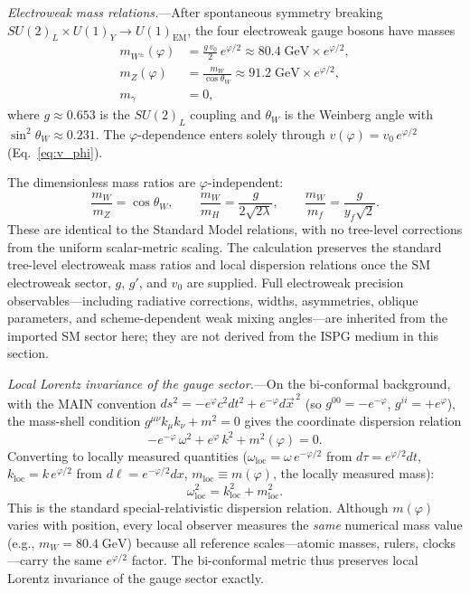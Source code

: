 \documentclass[aps,prd,onecolumn,superscriptaddress,nofootinbib,showpacs,12pt,notitlepage]{revtex4-2}
\begin{document}
\textit{Electroweak mass relations.}---After spontaneous
symmetry breaking
$SU(2)_L \times U(1)_Y \to U(1)_{\mathrm{EM}}$, the
four electroweak gauge bosons have masses
\begin{align}
  \label{eq:mW}
  m_{W^{\pm}}(\varphi)
    &= \frac{g\,v_0}{2}\,e^{\varphi/2}
    \approx 80.4\;\mathrm{GeV}\times e^{\varphi/2},\\[4pt]
  \label{eq:mZ}
  m_Z(\varphi)
    &= \frac{m_W}{\cos\theta_W}
    \approx 91.2\;\mathrm{GeV}\times e^{\varphi/2},\\[4pt]
  \label{eq:mgamma}
  m_\gamma &= 0,
\end{align}
where $g \approx 0.653$ is the $SU(2)_L$ coupling and
$\theta_W$ is the Weinberg angle with
$\sin^2\theta_W \approx 0.231$.  The $\varphi$-dependence
enters solely through $v(\varphi) = v_0\,e^{\varphi/2}$
(Eq.~\ref{eq:v_phi}).

The dimensionless mass ratios are $\varphi$-independent:
\begin{equation}\label{eq:gauge_ratios}
  \frac{m_W}{m_Z} = \cos\theta_W,\qquad
  \frac{m_W}{m_H} = \frac{g}{2\sqrt{2\lambda}},\qquad
  \frac{m_W}{m_f} = \frac{g}{y_f\sqrt{2}}.
\end{equation}
These are identical to the Standard Model relations, with
no tree-level corrections from the uniform scalar-metric
scaling.  The calculation preserves the standard tree-level
electroweak mass ratios and local dispersion relations once
the SM electroweak sector, $g$, $g'$, and $v_0$ are supplied.
Full electroweak precision observables---including radiative
corrections, widths, asymmetries, oblique parameters, and
scheme-dependent weak mixing angles---are inherited from the
imported SM sector here; they are not derived from the ISPG
medium in this section.

\textit{Local Lorentz invariance of the gauge sector.}---On
the bi-conformal background, with the MAIN convention
$ds^{2} = -e^{\varphi}c^{2}dt^{2} + e^{-\varphi}d\vec x^{\,2}$
(so $g^{00}=-e^{-\varphi}$, $g^{ii}=+e^{\varphi}$), the
mass-shell condition $g^{\mu\nu}k_\mu k_\nu + m^2 = 0$
gives the coordinate dispersion relation
\begin{equation}\label{eq:disp_gauge}
  -e^{-\varphi}\,\omega^2 + e^{\varphi}\,k^2 + m^2(\varphi)
  = 0.
\end{equation}
Converting to locally measured quantities
($\omega_{\mathrm{loc}} = \omega\,e^{-\varphi/2}$ from
$d\tau = e^{\varphi/2}dt$,
$k_{\mathrm{loc}} = k\,e^{\varphi/2}$ from
$d\ell = e^{-\varphi/2}dx$,
$m_{\mathrm{loc}} \equiv m(\varphi)$, the locally
measured mass):
\begin{equation}\label{eq:disp_local}
  \omega_{\mathrm{loc}}^2
  = k_{\mathrm{loc}}^2 + m_{\mathrm{loc}}^2.
\end{equation}
This is the standard special-relativistic dispersion
relation.  Although $m(\varphi)$ varies with position,
every local observer measures the \emph{same} numerical
mass value (e.g., $m_W = 80.4\;\mathrm{GeV}$) because
all reference scales---atomic masses, rulers, clocks---carry
the same $e^{\varphi/2}$ factor.  The bi-conformal metric
thus preserves local Lorentz invariance of the gauge sector
exactly.
\end{document}
